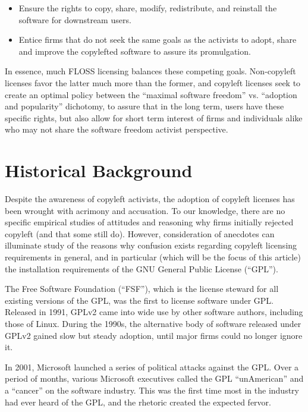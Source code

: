 \begin{itemize}

\item Ensure the rights to copy, share, modify, redistribute,
  and reinstall the software for downstream users.

\item Entice firms that do not seek the same goals as the activists to adopt,
  share and improve the copylefted software to assure its promulgation.
\end{itemize}

In essence, much FLOSS licensing balances these competing goals.
Non-copyleft licenses favor the latter much more than the former, and
copyleft licenses seek to create an optimal policy between the ``maximal
software freedom'' vs. ``adoption and popularity'' dichotomy, to assure that
in the long term, users have these specific rights, but also allow for short
term interest of firms and individuals alike who may not share the software
freedom activist perspective.

\section{Historical Background}

Despite the awareness of copyleft activists, the adoption of copyleft
licenses has been wrought with acrimony and accusation.  To our knowledge,
there are no specific empirical studies of attitudes and reasoning why firms
initially rejected copyleft (and that some still do).  However, consideration
of anecdotes can illuminate study of the reasons why confusion exists
regarding copyleft licensing requirements in general, and in particular
(which will be the focus of this article) the installation requirements of
the GNU General Public License (``GPL'').

The Free Software Foundation (``FSF''), which is the license steward for all
existing versions of the GPL, was the first to license software under GPL\@.
Released in 1991, GPLv2 came into wide use by other software authors,
including those of Linux.  During the 1990s, the alternative body of software
released under GPLv2 gained slow but steady adoption, until major firms could
no longer ignore it.

In 2001, Microsoft launched a series of political attacks against the GPL\@.
Over a period of months, various Microsoft executives called the GPL
``unAmerican'' and a ``cancer'' on the software industry.  This was the first
time most in the industry had ever heard of the GPL, and the rhetoric created
the expected fervor.


